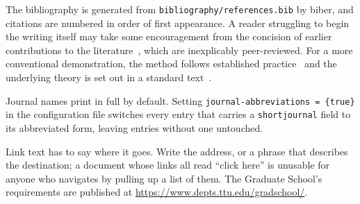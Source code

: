 The bibliography is generated from \verb|bibliography/references.bib| by
biber, and citations are numbered in order of first appearance. A reader
struggling to begin the writing itself may take some encouragement from the
concision of earlier contributions to the
literature~\cite{upper1974}, which are inexplicably peer-reviewed. For a more 
conventional demonstration, the method
follows established practice~\cite{example-article} and the underlying theory
is set out in a standard text~\cite{example-book}.

Journal names print in full by default. Setting
\verb|journal-abbreviations = {true}| in the configuration file switches every
entry that carries a \verb|shortjournal| field to its abbreviated form,
leaving entries without one untouched.

Link text has to say where it goes. Write the address, or a phrase that
describes the destination; a document whose links all read ``click here'' is
unusable for anyone who navigates by pulling up a list of them. The Graduate
School's requirements are published at
\url{https://www.depts.ttu.edu/gradschool/}.
